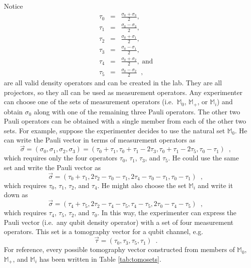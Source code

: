 Notice
\begin{eqnarray*}
\tau_0 &=& \frac{\sigma_0+\sigma_3}{2},\\
\tau_1 &=& \frac{\sigma_0-\sigma_3}{2},\\
\tau_2 &=& \frac{\sigma_0+\sigma_1}{2},\\
\tau_3 &=& \frac{\sigma_0-\sigma_1}{2},\\
\tau_4 &=& \frac{\sigma_0+\sigma_2}{2},\;\mathrm{and}\\
\tau_5 &=& \frac{\sigma_0-\sigma_2}{2}\;\;,
\end{eqnarray*}
are all valid density operators and can be created in the lab.  They are all projectors, so they all can be used as measurement operators.  Any experimenter can choose one of the sets of measurement operators (i.e.\ $\mathbb{M}_0$, $\mathbb{M}_+$, or $\mathbb{M}_i$) and obtain $\sigma_0$ along with one of the remaining three Pauli operators.  The other two Pauli operators can be obtained with a single member from each of the other two sets.  For example, suppose the experimenter decides to use the natural set $\mathbb{M}_0$.  He can write the Pauli vector in terms of measurement operators as
$$
\vec{\sigma} = (\sigma_0,\sigma_1,\sigma_2,\sigma_3) = (\tau_0+\tau_1,\tau_0+\tau_1-2\tau_3,\tau_0+\tau_1-2\tau_5,\tau_0-\tau_1)\;\;,
$$
which requires only the four operators $\tau_0$, $\tau_1$, $\tau_3$, and $\tau_5$.  He could use the same set and write the Pauli vector as
$$
\vec{\sigma} = (\tau_0+\tau_1,2\tau_2-\tau_0-\tau_1,2\tau_4-\tau_0-\tau_1,\tau_0-\tau_1)\;\;,
$$
which requires $\tau_0$, $\tau_1$, $\tau_2$, and $\tau_4$.  He might also choose the set $\mathbb{M}_i$ and write it down as
$$
\vec{\sigma} = (\tau_4+\tau_5,2\tau_2-\tau_4-\tau_5,\tau_4-\tau_5,2\tau_0-\tau_4-\tau_5)\;\;,
$$
which requires $\tau_4$, $\tau_5$, $\tau_2$, and $\tau_0$.  In this way, the experimenter can express the Pauli vector (i.e.\ any qubit density operator) with a set of four measurement operators.  This set is a tomography vector for a qubit channel, e.g.\
$$
\vec{\tau} = (\tau_0,\tau_3,\tau_5,\tau_1)\;\;.
$$
For reference, every possible tomography vector constructed from members of $\mathbb{M}_{0}$, $\mathbb{M}_{+}$, and $\mathbb{M}_{i}$ has been written in Table \ref{tab:tomosets}.
